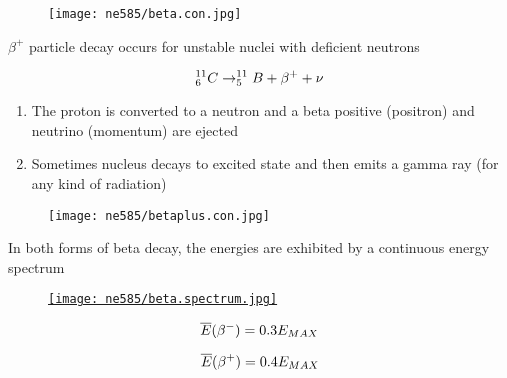 \documentclass[aspectratio=1610,pdftex,dvipsnames,compress,xcolor={dvipsnames}]{beamer}
\begin{document}
\begin{frame}{}
    \begin{figure}
        \centering
        \texttt{[image: ne585/beta.con.jpg]}
    \end{figure}
\end{frame}


\begin{frame}{$\beta^+$ particle decay occurs for unstable nuclei with deficient neutrons}

    \begin{equation}
        \LARGE
        ^{11}_{6}C \rightarrow ^{11}_{5}B + \beta^{+} + \nu 
    \end{equation}

    \vspace*{\fill}

    \begin{enumerate}[series=outerlist,topsep=0pt,itemsep=21pt,leftmargin=*,label=(\arabic*)]
        \item[]The proton is converted to a neutron and a beta positive (positron) and neutrino (momentum) are ejected
        \item[]Sometimes nucleus decays to excited state and then emits a gamma ray (for any kind of radiation)
    \end{enumerate}
\end{frame}


\begin{frame}{}
    \begin{figure}
        \centering
        \texttt{[image: ne585/betaplus.con.jpg]}
    \end{figure}
\end{frame}


\begin{frame}{In both forms of beta decay, the energies are exhibited by a continuous energy spectrum}
    \begin{figure}
        \centering
        \href{http://images.slideplayer.com/17/5357960/slides/slide_24.jpg}{\texttt{[image: ne585/beta.spectrum.jpg]}}
    \end{figure}

    \vspace*{\fill}

    \begin{equation}
        \LARGE
        \overline{E}(\beta^-)=0.3E_{MAX}
    \end{equation}

    \begin{equation}
        \LARGE
        \overline{E}(\beta^+)=0.4E_{MAX}
    \end{equation}
\end{frame}
\end{document}
